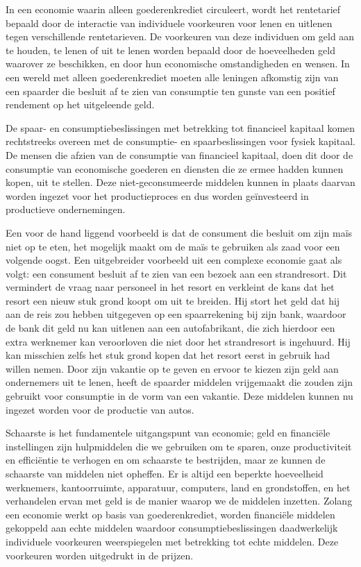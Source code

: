 \documentclass[
  a5paper,
  smalldemyvopaper,11pt,twoside,onecolumn,openright,extrafontsizes,
hidelinks]{memoir}
\begin{document}
In een economie waarin alleen goederenkrediet circuleert, wordt het
rentetarief bepaald door de interactie van individuele voorkeuren voor
lenen en uitlenen tegen verschillende rentetarieven. De voorkeuren van
deze individuen om geld aan te houden, te lenen of uit te lenen worden
bepaald door de hoeveelheden geld waarover ze beschikken, en door hun
economische omstandigheden en wensen. In een wereld met alleen
goederenkrediet moeten alle leningen afkomstig zijn van een spaarder die
besluit af te zien van consumptie ten gunste van een positief rendement
op het uitgeleende geld.

De spaar- en consumptiebeslissingen met betrekking tot financieel
kapitaal komen rechtstreeks overeen met de consumptie- en
spaarbeslissingen voor fysiek kapitaal. De mensen die afzien van de
consumptie van financieel kapitaal, doen dit door de consumptie van
economische goederen en diensten die ze ermee hadden kunnen kopen, uit
te stellen. Deze niet-geconsumeerde middelen kunnen in plaats daarvan
worden ingezet voor het productieproces en dus worden geïnvesteerd in
productieve ondernemingen.

Een voor de hand liggend voorbeeld is dat de consument die besluit om
zijn maïs niet op te eten, het mogelijk maakt om de maïs te gebruiken
als zaad voor een volgende oogst. Een uitgebreider voorbeeld uit een
complexe economie gaat als volgt: een consument besluit af te zien van
een bezoek aan een strandresort. Dit vermindert de vraag naar personeel
in het resort en verkleint de kans dat het resort een nieuw stuk grond
koopt om uit te breiden. Hij stort het geld dat hij aan de reis zou
hebben uitgegeven op een spaarrekening bij zijn bank, waardoor de bank
dit geld nu kan uitlenen aan een autofabrikant, die zich hierdoor een
extra werknemer kan veroorloven die niet door het strandresort is
ingehuurd. Hij kan misschien zelfs het stuk grond kopen dat het resort
eerst in gebruik had willen nemen. Door zijn vakantie op te geven en
ervoor te kiezen zijn geld aan ondernemers uit te lenen, heeft de
spaarder middelen vrijgemaakt die zouden zijn gebruikt voor consumptie
in de vorm van een vakantie. Deze middelen kunnen nu ingezet worden voor
de productie van autos.

Schaarste is het fundamentele uitgangspunt van economie; geld en
financiële instellingen zijn hulpmiddelen die we gebruiken om te sparen,
onze productiviteit en efficiëntie te verhogen en om schaarste te
bestrijden, maar ze kunnen de schaarste van middelen niet opheffen. Er
is altijd een beperkte hoeveelheid werknemers, kantoorruimte,
apparatuur, computers, land en grondstoffen, en het verhandelen ervan
met geld is de manier waarop we de middelen inzetten. Zolang een
economie werkt op basis van goederenkrediet, worden financiële middelen
gekoppeld aan echte middelen waardoor consumptiebeslissingen
daadwerkelijk individuele voorkeuren weerspiegelen met betrekking tot
echte middelen. Deze voorkeuren worden uitgedrukt in de prijzen.
\end{document}
